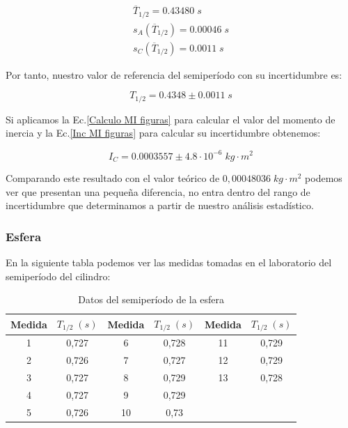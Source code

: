 \documentclass[a4paper,12pt,titlepage]{report}
\begin{document}
\begin{equation}
    \begin{gathered}
        \overline{T}_{1/2} = 0.43480 \; s \\
        s_A(\overline{T}_{1/2}) = 0.00046 \; s \\
        s_C(\overline{T}_{1/2}) = 0.0011 \; s
    \end{gathered}
\end{equation}

Por tanto, nuestro valor de referencia del semiperíodo con su incertidumbre es:

\begin{equation}
    T_{1/2} = 0.4348 \pm 0.0011 \; s
\end{equation}

Si aplicamos la Ec.\ref{Calculo MI figuras} para calcular el valor del momento de inercia y la Ec.\ref{Inc MI figuras} para calcular su incertidumbre obtenemos:

\begin{equation}
    I_C = 0.0003557 \pm 4.8 \cdot 10^{-6} \; kg\cdot m^2
\end{equation}

Comparando este resultado con el valor teórico de $0,00048036 \; kg \cdot m^2$ podemos ver que presentan una pequeña diferencia, no entra dentro del rango de incertidumbre que determinamos a partir de nuestro análisis estadístico.

\newpage

\subsubsection{Esfera}

En la siguiente tabla podemos ver las medidas tomadas en el laboratorio del semiperíodo del cilindro:

\begin{table}[h!]
    \centering
    \begin{tabular}{|c|c|c|c|cc}
    \hline
    Medida  &  $T_{1/2}\; (s)$ & Medida   & $T_{1/2}\; (s)$   & \multicolumn{1}{c|}{Medida}   & \multicolumn{1}{c|}{$T_{1/2}\; (s)$}      \\ \hline
    1 & 0,727 & 6  & 0,728 & \multicolumn{1}{c|}{11} & \multicolumn{1}{c|}{0,729} \\ \hline
    2 & 0,726 & 7  & 0,727 & \multicolumn{1}{c|}{12} & \multicolumn{1}{c|}{0,729} \\ \hline
    3 & 0,727 & 8  & 0,729 & \multicolumn{1}{c|}{13} & \multicolumn{1}{c|}{0,728} \\ \hline
    4 & 0,727 & 9  & 0,729 &                         &                            \\ \cline{1-4}
    5 & 0,726 & 10 & 0,73  &                         &                            \\ \cline{1-4}
    \end{tabular}
    \caption{Datos del semiperíodo de la esfera}
    \label{Datos semiT esfera}
\end{table}
\end{document}
